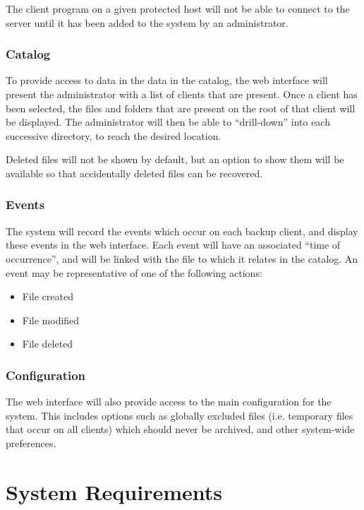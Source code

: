 The client program on a given protected host will not be able to connect to the
server until it has been added to the system by an administrator.

\subsubsection{Catalog}

To provide access to data in the data in the catalog, the web interface will
present the administrator with a list of clients that are present. Once
a client has been selected, the files and folders that are present on the root
of that client will be displayed. The administrator will then be able to
``drill-down'' into each successive directory, to reach the desired location.

Deleted files will not be shown by default, but an option to show them will be
available so that accidentally deleted files can be recovered.

\subsubsection{Events}

The system will record the events which occur on each backup client, and
display these events in the web interface. Each event will have an associated
``time of occurrence'', and will be linked with the file to which it relates in
the catalog. An event may be representative of one of the following actions:

\begin{itemize}
    \item File created
    \item File modified
    \item File deleted
\end{itemize}

\subsubsection{Configuration}

The web interface will also provide access to the main configuration for the
system. This includes options such as globally excluded files (i.e. temporary
files that occur on all clients) which should never be archived, and other
system-wide preferences.

\section{System Requirements}

